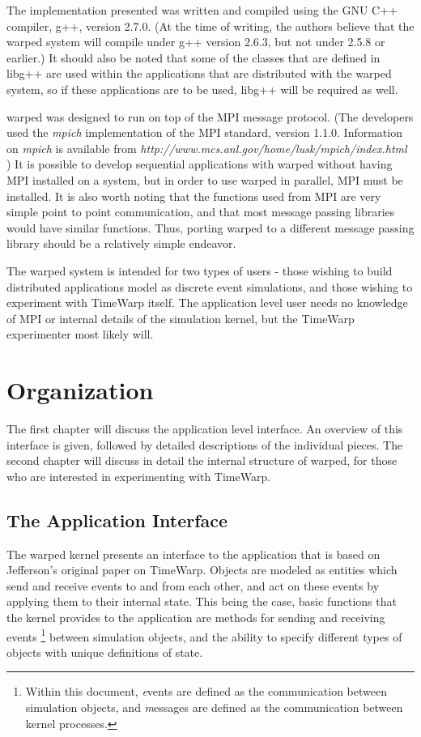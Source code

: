 \documentclass[11pt]{report}
\begin{document}
The implementation presented was written and compiled using the GNU C++
compiler, g++, version 2.7.0. (At the time of writing, the authors
believe that the {\sc warped} system will compile under g++ version
2.6.3, but not under 2.5.8 or earlier.)  It should also be noted that
some of the classes that are defined in libg++ are used within the
applications that are distributed with the {\sc warped} system, so if
these applications are to be used, libg++ will be required as well.

{\sc warped} was designed to run on top of the MPI message protocol.
(The developers used the {\it mpich} implementation of the MPI
standard, version 1.1.0.  Information on {\it mpich} is available from
{\it http://www.mcs.anl.gov/home/lusk/mpich/index.html} ) It is
possible to develop sequential applications with {\sc warped} without
having MPI installed on a system, but in order to use {\sc warped} in
parallel, MPI must be installed.  It is also worth noting that the
functions used from MPI are very simple point to point communication,
and that most message passing libraries would have similar functions.
Thus, porting {\sc warped} to a different message passing library should
be a relatively simple endeavor.

The {\sc warped} system is intended for two types of users - those
wishing to build distributed applications model as discrete event
simulations, and those wishing to experiment with TimeWarp itself.
The application level user needs no knowledge of MPI or internal details
of the simulation kernel, but the TimeWarp experimenter most likely
will.

\chapter{Organization}

The first chapter will discuss the application level interface.  An
overview of this interface is given, followed by detailed descriptions
of the individual pieces.  The second chapter will discuss in detail the
internal structure of {\sc warped}, for those who are interested in
experimenting with TimeWarp.

\section{The Application Interface}

The {\sc warped} kernel presents an interface to the application that is
based on Jefferson's original paper on TimeWarp.  Objects are modeled
as entities which send and receive events to and from each other, and
act on these events by applying them to their internal state.  This
being the case, basic functions that the kernel provides to the
application are methods for sending and receiving events \footnote{
Within this document, {\emph events} are defined as the communication
between simulation objects, and {\emph messages} are defined as the
communication between kernel processes.} between simulation objects, and
the ability to specify different types of objects with unique
definitions of state.
\end{document}
